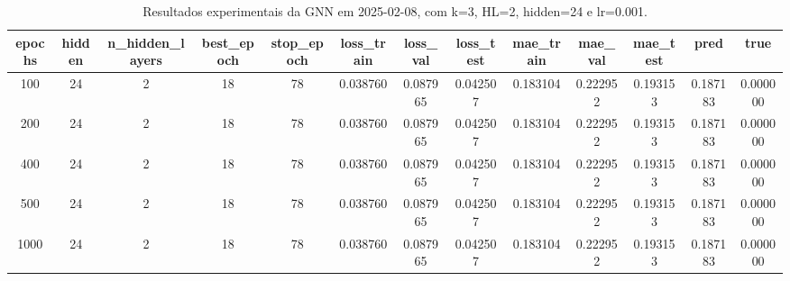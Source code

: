 \begin{table}[h]
\centering
\caption{Resultados experimentais da GNN em 2025-02-08, com k=3, HL=2, hidden=24 e lr=0.001.}
\label{tab:gnn_results_k3_hl2_h24_d20250208}
\begin{tabular}{ccccccccccccc}
\toprule
epochs & hidden & n\_hidden\_layers & best\_epoch & stop\_epoch & loss\_train & loss\_val & loss\_test & mae\_train & mae\_val & mae\_test & pred & true \\
\midrule
100 & 24 & 2 & 18 & 78 & 0.038760 & 0.087965 & 0.042507 & 0.183104 & 0.222952 & 0.193153 & 0.187183 & 0.000000 \\
200 & 24 & 2 & 18 & 78 & 0.038760 & 0.087965 & 0.042507 & 0.183104 & 0.222952 & 0.193153 & 0.187183 & 0.000000 \\
400 & 24 & 2 & 18 & 78 & 0.038760 & 0.087965 & 0.042507 & 0.183104 & 0.222952 & 0.193153 & 0.187183 & 0.000000 \\
500 & 24 & 2 & 18 & 78 & 0.038760 & 0.087965 & 0.042507 & 0.183104 & 0.222952 & 0.193153 & 0.187183 & 0.000000 \\
1000 & 24 & 2 & 18 & 78 & 0.038760 & 0.087965 & 0.042507 & 0.183104 & 0.222952 & 0.193153 & 0.187183 & 0.000000 \\
\bottomrule
\end{tabular}
\end{table}
